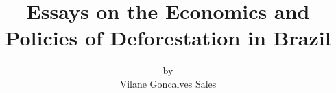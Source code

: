 \title{Essays on the Economics and Policies of Deforestation in Brazil}


\author{by \\ Vilane Goncalves Sales}









     

